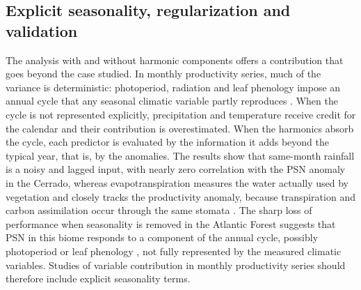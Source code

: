\documentclass[a4paper,fleqn]{cas-dc}
\begin{document}
\subsection{Explicit seasonality, regularization and validation}

The analysis with and without harmonic components offers a contribution that goes beyond the case studied. In monthly productivity series, much of the variance is deterministic: photoperiod, radiation and leaf phenology impose an annual cycle that any seasonal climatic variable partly reproduces \citep{wu2016,alberton2019}. When the cycle is not represented explicitly, precipitation and temperature receive credit for the calendar and their contribution is overestimated. When the harmonics absorb the cycle, each predictor is evaluated by the information it adds beyond the typical year, that is, by the anomalies. The results show that same-month rainfall is a noisy and lagged input, with nearly zero correlation with the PSN anomaly in the Cerrado, whereas evapotranspiration measures the water actually used by vegetation and closely tracks the productivity anomaly, because transpiration and carbon assimilation occur through the same stomata \citep{lawson2019}. The sharp loss of performance when seasonality is removed in the Atlantic Forest suggests that PSN in this biome responds to a component of the annual cycle, possibly photoperiod or leaf phenology \citep{borchert2001,wu2016}, not fully represented by the measured climatic variables. Studies of variable contribution in monthly productivity series should therefore include explicit seasonality terms.
\end{document}
